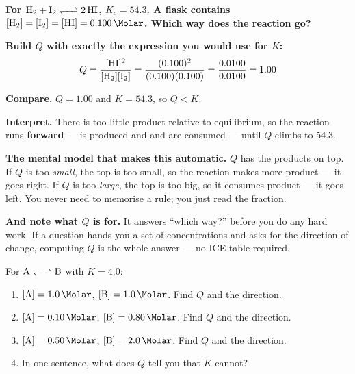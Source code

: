 \documentclass{apchem-worksheet}
\begin{document}
\begin{workedexample}
\textbf{For $\ce{H2 + I2 <=> 2HI}$, $K_{c} = 54.3$. A flask contains
$[\ce{H2}] = [\ce{I2}] = [\ce{HI}] = \SI{0.100}{\Molar}$. Which way
does the reaction go?}

\textbf{Build $Q$ with exactly the expression you would use for $K$:}
\[ Q = \frac{[\ce{HI}]^{2}}{[\ce{H2}][\ce{I2}]}
     = \frac{(0.100)^{2}}{(0.100)(0.100)}
     = \frac{0.0100}{0.0100} = 1.00 \]

\textbf{Compare.} $Q = 1.00$ and $K = 54.3$, so $Q < K$.

\textbf{Interpret.} There is too little product relative to
equilibrium, so the reaction runs \textbf{forward} ---  is
produced and  and  are consumed --- until $Q$ climbs to
54.3.

\textbf{The mental model that makes this automatic.} $Q$ has the
products on top. If $Q$ is too \emph{small}, the top is too small, so
the reaction makes more product --- it goes right. If $Q$ is too
\emph{large}, the top is too big, so it consumes product --- it goes
left. You never need to memorise a rule; you just read the fraction.

\textbf{And note what $Q$ is for.} It answers ``which way?'' before you
do any hard work. If a question hands you a set of concentrations and
asks for the direction of change, computing $Q$ is the whole answer ---
no ICE table required.
\end{workedexample}

\begin{yourturn}
For $\ce{A <=> B}$ with $K = 4.0$:
\begin{enumerate}[leftmargin=*,itemsep=0.5em]
  \item $[\ce{A}] = \SI{1.0}{\Molar}$, $[\ce{B}] = \SI{1.0}{\Molar}$.
        Find $Q$ and the direction. \workspace[1.8cm]
  \item $[\ce{A}] = \SI{0.10}{\Molar}$, $[\ce{B}] = \SI{0.80}{\Molar}$.
        Find $Q$ and the direction. \workspace[1.8cm]
  \item $[\ce{A}] = \SI{0.50}{\Molar}$, $[\ce{B}] = \SI{2.0}{\Molar}$.
        Find $Q$ and the direction. \workspace[1.8cm]
  \item In one sentence, what does $Q$ tell you that $K$ cannot?
        \workspace[1.6cm]
\end{enumerate}
\end{yourturn}
\end{document}
